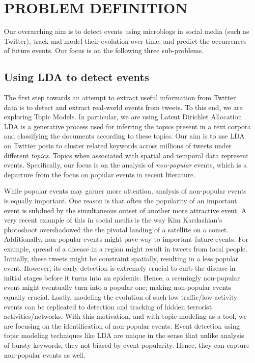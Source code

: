 \section{\uppercase{Problem Definition}}
Our overarching aim is to detect events using microblogs in social media (such as Twitter), track and model their evolution over time, and predict the occurrences of future events. Our focus is on the following three sub-problems.

\subsection{Using LDA to detect events}
The first step towards an attempt to extract useful information from Twitter data is to detect and extract real-world events from tweets. To this end, we are exploring Topic Models. In particular, we are using Latent Dirichlet Allocation \cite{blei2003latent}. LDA is a generative process used for inferring the topics present in a text corpora and classifying the documents according to these topics. Our aim is to use LDA on Twitter posts to cluster related keywords across millions of tweets under different \emph{topics}. Topics when associated with spatial and temporal data represent events. Specifically, our focus is on the analysis of \emph{non-popular} events, which is a departure from the focus on popular events in recent literature.

While popular events may garner more attention, analysis of non-popular events is equally important. One reason is that often the popularity of an important event is subdued by the simultaneous outset of another more attractive event. A very recent example of this in social media is the way Kim Kardashian's photoshoot overshadowed the the pivotal landing of a satellite on a comet. Additionally, non-popular events might pave way to important future events. For example, spread of a disease in a region might result in tweets from local people. Initially, these tweets might be constraint spatially, resulting in a less popular event. However, its early detection is extremely crucial to curb the disease in initial stages before it turns into an epidemic. Hence, a seemingly non-popular event might eventually turn into a popular one; making non-popular events equally crucial. Lastly, modeling the evolution of such low traffic/low activity events can be replicated to detection and tracking of hidden terrorist activities/networks. With this motivation, and with topic modeling as a tool, we are focusing on the identification of non-popular events. Event detection using topic modeling techniques like LDA are unique in the sense that unlike analysis of bursty keywords, they not biased by event popularity. Hence, they can capture non-popular events as well.

